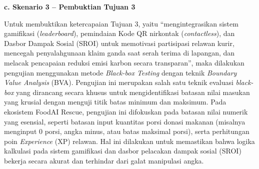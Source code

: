 \textbf{c. Skenario 3 – Pembuktian Tujuan 3}

Untuk membuktikan ketercapaian Tujuan 3, yaitu “mengintegrasikan sistem gamifikasi (\textit{leaderboard}), pemindaian Kode QR nirkontak (\textit{contactless}), dan Dasbor Dampak Sosial (SROI) untuk memotivasi partisipasi relawan kurir, mencegah penyalahgunaan klaim ganda saat serah terima di lapangan, dan melacak pencapaian reduksi emisi karbon secara transparan”, maka dilakukan pengujian menggunakan metode \textit{Black-box Testing} dengan teknik \textit{Boundary Value Analysis} (BVA). Pengujian ini merupakan salah satu teknik evaluasi \textit{black-box} yang dirancang secara khusus untuk mengidentifikasi batasan nilai masukan yang krusial dengan menguji titik batas minimum dan maksimum. Pada ekosistem FoodAI Rescue, pengujian ini difokuskan pada batasan nilai numerik yang esensial, seperti batasan input kuantitas porsi donasi makanan (misalnya menginput 0 porsi, angka minus, atau batas maksimal porsi), serta perhitungan poin \textit{Experience} (XP) relawan. Hal ini dilakukan untuk memastikan bahwa logika kalkulasi pada sistem gamifikasi dan dasbor pelacakan dampak sosial (SROI) bekerja secara akurat dan terhindar dari galat manipulasi angka.

